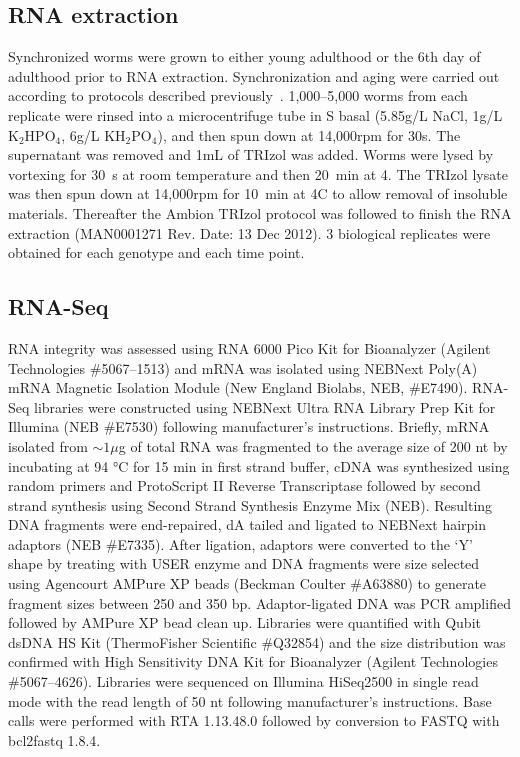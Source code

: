 \documentclass[10pt,letterpaper,twocolumn]{article}
\begin{document}
\subsection*{RNA extraction}
\label{sb:rna_extraction}
Synchronized worms were grown to either young adulthood or the 6th day of
adulthood prior to RNA extraction. Synchronization and aging were carried out
according to protocols described previously~\cite{Leighton2014}. 1,000--5,000
worms from each replicate were rinsed into a microcentrifuge tube in S basal
(5.85g/L NaCl, 1g/L $\mathrm{K}_2\mathrm{HPO}_4$, 6g/L
$\mathrm{KH}_2\mathrm{PO}_4$), and then spun down at 14,000rpm for 30s. The
supernatant was removed and 1mL of TRIzol was added. Worms were lysed by
vortexing for 30~s at room temperature and then 20~min at 4\degree. The TRIzol
lysate was then spun down at 14,000rpm for 10~min at 4\degree{}C to allow
removal of insoluble materials. Thereafter the Ambion TRIzol protocol was
followed to finish the RNA extraction (MAN0001271 Rev. Date: 13 Dec 2012).
3 biological replicates were obtained for each genotype and each time point.

\subsection*{RNA-Seq}
\label{sb:rna_seq}
RNA integrity was assessed using RNA 6000 Pico Kit for Bioanalyzer (Agilent
Technologies \#5067--1513) and mRNA was isolated using NEBNext Poly(A) mRNA
Magnetic Isolation Module (New England Biolabs, NEB, \#E7490). RNA-Seq libraries
were constructed using NEBNext Ultra RNA Library Prep Kit for Illumina (NEB
\#E7530) following manufacturer’s instructions. Briefly, mRNA isolated from
$\sim1\mu$g of total RNA was fragmented to the average size of 200 nt by
incubating at 94 °C for 15 min in first strand buffer, cDNA was synthesized
using random primers and ProtoScript II Reverse Transcriptase followed by
second strand synthesis using Second Strand Synthesis Enzyme Mix (NEB).
Resulting DNA fragments were end-repaired, dA tailed and ligated to NEBNext
hairpin adaptors (NEB \#E7335).
After ligation, adaptors were converted to the ‘Y’ shape by treating with USER
enzyme and DNA fragments were size selected using Agencourt AMPure XP beads
(Beckman Coulter \#A63880) to generate fragment sizes between 250 and 350 bp.
Adaptor-ligated DNA was PCR amplified followed by AMPure XP bead clean up.
Libraries were quantified with Qubit dsDNA HS Kit (ThermoFisher Scientific
\#Q32854) and the size distribution was confirmed with High Sensitivity DNA Kit
for Bioanalyzer (Agilent Technologies \#5067--4626).
Libraries were sequenced on Illumina HiSeq2500 in single read mode with the read
length of 50 nt following manufacturer's instructions. Base calls were performed
with RTA 1.13.48.0 followed by conversion to FASTQ with bcl2fastq 1.8.4.
\end{document}
